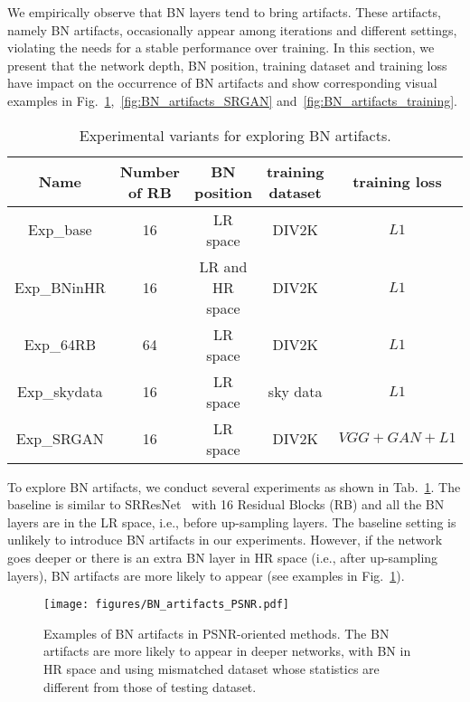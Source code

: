 \documentclass[runningheads]{llncs}
\begin{document}
We empirically observe that BN layers tend to bring artifacts.
%
These artifacts, namely BN artifacts, occasionally appear among iterations and different settings, violating the needs 
for a stable performance over training.
In this section, we present that the network depth, BN position, training dataset and training loss have impact on 
the occurrence of BN artifacts and show corresponding visual examples in 
Fig.~\ref{fig:BN_artifacts_PSNR},~\ref{fig:BN_artifacts_SRGAN} and~\ref{fig:BN_artifacts_training}.

\begin{table}[htbp]
	\vspace{-0.4cm}
	\centering
	\caption{Experimental variants for exploring BN artifacts.}
	\label{tb:BN}
	\begin{tabular}{|c|c|c|c|c|}
		\hline
		Name & Number of RB & BN position & training dataset & training loss \\ \hline
		Exp\_base & 16 & LR space & DIV2K & $L1$ \\ \hline
		Exp\_BNinHR & 16 & LR and HR space & DIV2K & $L1$ \\ \hline
		Exp\_64RB & 64 & LR space & DIV2K & $L1$ \\ \hline
		Exp\_skydata & 16 & LR space & sky data & $L1$ \\ \hline
		Exp\_SRGAN & 16 & LR space & DIV2K & $VGG+GAN+L1$ \\ \hline
	\end{tabular}
	\vspace{-0.4cm}
\end{table}

To explore BN artifacts, we conduct several experiments as shown in Tab.~\ref{tb:BN}.
%
The baseline is similar to SRResNet~\cite{ledig2017photo} with 16 Residual Blocks (RB) and all the BN layers are in 
the LR space, i.e., before up-sampling layers. 
The baseline setting is unlikely to introduce BN artifacts in our experiments.
However, if the network goes deeper or there is an extra BN layer in HR space (i.e., after up-sampling layers), BN 
artifacts are more likely to appear (see examples in Fig.~\ref{fig:BN_artifacts_PSNR}). 

\begin{figure}[htbp]
	\vspace{-0.2cm}
	\begin{center}
		\texttt{[image: figures/BN\_artifacts\_PSNR.pdf]}
	\end{center}
	\vspace{-0.4cm}
	\caption{Examples of BN artifacts in PSNR-oriented methods. The BN artifacts are more likely to appear in deeper 
		networks, with BN in HR space and using mismatched dataset whose statistics are different from those of 
		testing dataset.}
	\vspace{-0.4cm}
	\label{fig:BN_artifacts_PSNR}
\end{figure}
\end{document}
